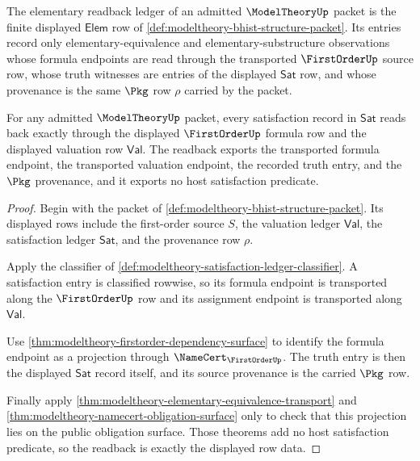 \begin{definition}\label{def:modeltheory-elementary-readback-ledger}
The elementary readback ledger of an admitted $\ModelTheoryUp$ packet is the
finite displayed $\mathsf{Elem}$ row of
\autoref{def:modeltheory-bhist-structure-packet}. Its entries record only
elementary-equivalence and elementary-substructure observations whose formula
endpoints are read through the transported $\FirstOrderUp$ source row, whose
truth witnesses are entries of the displayed $\mathsf{Sat}$ row, and whose
provenance is the same $\Pkg$ row $\rho$ carried by the packet.
\end{definition}

\begin{theorem}\label{thm:modeltheory-satisfaction-exactness-ledger}
For any admitted $\ModelTheoryUp$ packet, every satisfaction record in
$\mathsf{Sat}$ reads back exactly through the displayed $\FirstOrderUp$
formula row and the displayed valuation row $\mathsf{Val}$. The readback
exports the transported formula endpoint, the transported valuation endpoint,
the recorded truth entry, and the $\Pkg$ provenance, and it exports no host
satisfaction predicate.
\end{theorem}
\begin{proof}
Begin with the packet of
\autoref{def:modeltheory-bhist-structure-packet}. Its displayed rows include
the first-order source $S$, the valuation ledger $\mathsf{Val}$, the
satisfaction ledger $\mathsf{Sat}$, and the provenance row $\rho$.

Apply the classifier of
\autoref{def:modeltheory-satisfaction-ledger-classifier}. A satisfaction
entry is classified rowwise, so its formula endpoint is transported along
the $\FirstOrderUp$ row and its assignment endpoint is transported along
$\mathsf{Val}$.

Use \autoref{thm:modeltheory-firstorder-dependency-surface} to identify the
formula endpoint as a projection through $\NameCert_{\FirstOrderUp}$. The
truth entry is then the displayed $\mathsf{Sat}$ record itself, and its source
provenance is the carried $\Pkg$ row.

Finally apply
\autoref{thm:modeltheory-elementary-equivalence-transport} and
\autoref{thm:modeltheory-namecert-obligation-surface} only to check that this
projection lies on the public obligation surface. Those theorems add no host
satisfaction predicate, so the readback is exactly the displayed row data.
\end{proof}

